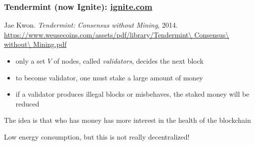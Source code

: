 \documentclass[11pt]{beamer}  %
\begin{document}
\begin{frame}\frametitle{Tendermint (now Ignite): \url{ignite.com}}

  \begin{greenbox}{Jae Kwon. \emph{Tendermint: Consensus without Mining}, 2014.\\
    \url{https://www.weusecoins.com/assets/pdf/library/Tendermint\ Consensus\ without\ Mining.pdf}}
    \begin{itemize}
    \item only a set $V$ of nodes, called \emph{validators}, decides the next block
    \item to become validator, one must stake a large amount of money
    \item if a validator produces illegal blocks or misbehaves, the staked money will be reduced
    \end{itemize}
  \end{greenbox}

  \smallskip

  \begin{center}
    The idea is that who has money has more interest in the health of the blockchain
  \end{center}

  \smallskip

  \begin{center}
    Low energy consumption, but this is not really decentralized!
  \end{center}

\end{frame}
\end{document}
